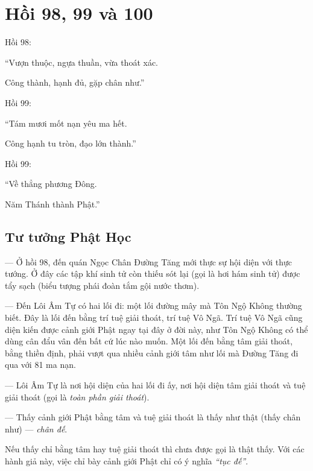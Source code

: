 \chapter{Hồi 98, 99 và 100} %
\label{cha:hoi_98_99_100}

Hồi 98:

\begin{itshape}
``Vượn thuộc, ngựa thuần, vừa thoát xác.

Công thành, hạnh đủ, gặp chân như.''
\end{itshape}

Hồi 99:

\begin{itshape}
``Tám mươi mốt nạn yêu ma hết.

Công hạnh tu tròn, đạo lớn thành.''
\end{itshape}

Hồi 99:

\begin{itshape}
``Về thẳng phương Đông.

Năm Thánh thành Phật.''
\end{itshape}

\section{Tư tưởng Phật Học} %
\label{sec:98_99_100_phat_hoc}

— Ở hồi 98, đến quán Ngọc Chân Đường Tăng mới thực sự hội diện với thực tướng. Ở đây các tập khí sinh tử còn thiếu sót lại (gọi là hơi hám sinh tử) được tẩy sạch (biểu tượng phái đoàn tắm gội nước thơm).

— Đến Lôi Âm Tự có hai lối đi: một lối đường mây mà Tôn Ngộ Không thường biết. Đây là lối đến bằng trí tuệ giải thoát, trí tuệ Vô Ngã. Trí tuệ Vô Ngã cũng diện kiến được cảnh giới Phật ngay tại đây ở đời này, như Tôn Ngộ Không có thể dùng cân đẩu vân đến bất cứ lúc nào muốn. Một lối đến bằng tâm giải thoát, bằng thiền định, phải vượt qua nhiều cảnh giới tâm như lối mà Đường Tăng đi qua với 81 ma nạn.

— Lôi Âm Tự là nơi hội diện của hai lối đi ấy, nơi hội diện tâm giải thoát và tuệ giải thoát (gọi là \emph{toàn phần giải thoát}).

— Thấy cảnh giới Phật bằng tâm và tuệ giải thoát là thấy như thật (thấy chân như) — \emph{chân đế}.

Nếu thấy chỉ bằng tâm hay tuệ giải thoát thì chưa được gọi là thật thấy. Với các hành giả này, việc chỉ bày cảnh giới Phật chỉ có ý nghĩa \emph{``tục đế''}.

